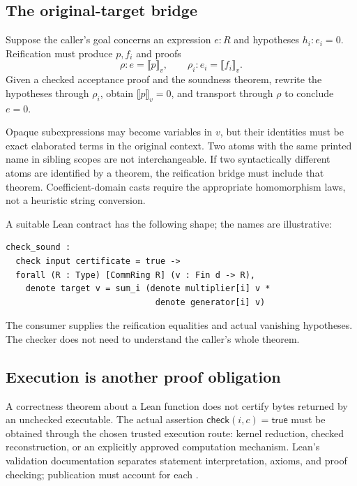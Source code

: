\documentclass[11pt,a4paper]{article}
\newcommand{\eval}[1]{\llbracket #1\rrbracket}
\theoremstyle{plain}
\theoremstyle{definition}
\theoremstyle{remark}
\begin{document}
\subsection{The original-target bridge}
Suppose the caller's goal concerns an expression $e:R$ and hypotheses
$h_i:e_i=0$. Reification must produce $p,f_i$ and proofs
\[
 \rho:e=\eval p_v,\qquad \rho_i:e_i=\eval{f_i}_v.
\]
Given a checked acceptance proof and the soundness theorem, rewrite the
hypotheses through $\rho_i$, obtain $\eval p_v=0$, and transport through
$\rho$ to conclude $e=0$.

Opaque subexpressions may become variables in $v$, but their identities must
be exact elaborated terms in the original context. Two atoms with the same
printed name in sibling scopes are not interchangeable. If two syntactically
different atoms are identified by a theorem, the reification bridge must
include that theorem. Coefficient-domain casts require the appropriate
homomorphism laws, not a heuristic string conversion.

A suitable Lean contract has the following shape; the names are illustrative:
\par\noindent\begin{minipage}{\linewidth}
\begin{lstlisting}
check_sound :
  check input certificate = true ->
  forall (R : Type) [CommRing R] (v : Fin d -> R),
    denote target v = sum_i (denote multiplier[i] v *
                              denote generator[i] v)
\end{lstlisting}
\end{minipage}\par

The consumer supplies the reification equalities and actual vanishing
hypotheses. The checker does not need to understand the caller's whole theorem.

\subsection{Execution is another proof obligation}
A correctness theorem about a Lean function does not certify bytes returned by
an unchecked executable. The actual assertion
$\mathsf{check}(i,c)=\mathsf{true}$ must be obtained through the chosen trusted
execution route: kernel reduction, checked reconstruction, or an explicitly
approved computation mechanism. Lean's validation documentation separates
statement interpretation, axioms, and proof checking; publication must account
for each \cite{leanvalidation}.
\end{document}
